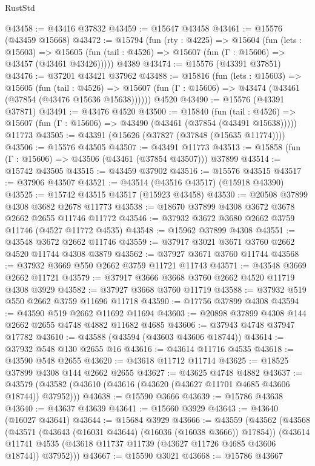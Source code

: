 \begin{lexlean}{RustStd}
\begin{coremodule}
@43458 := @43416 @37832
@43459 := @15647 @43458
@43461 := @15576 (@43459 @15668)
@43472 := @15794
    (fun (rty : @4225) =>
    @15604
      (fun (lets : @15603) =>
      @15605 (fun (tail : @4526) => @15607 (fun (Γ : @15606) => @43457 (@43461 @43426)))))
    @4389
@43474 := @15576 (@43391 @37851)
@43476 := @37201 @43421 @37962
@43488 := @15816
    (fun (lets : @15603) =>
    @15605
      (fun (tail : @4526) =>
      @15607 (fun (Γ : @15606) => @43474 (@43461 (@37854 (@43476 @15636 @15638))))))
    @4520
@43490 := @15576 (@43391 @37871)
@43491 := @43476 @4520
@43500 := @15840
    (fun (tail : @4526) => @15607 (fun (Γ : @15606) => @43490 (@43461 (@37854 (@43491 @15638)))))
    @11773
@43505 := @43391 (@15626 (@37827 (@37848 (@15635 @11774))))
@43506 := @15576 @43505
@43507 := @43491 @11773
@43513 := @15858 (fun (Γ : @15606) => @43506 (@43461 (@37854 @43507))) @37899
@43514 := @15742 @43505
@43515 := @43459 @37902
@43516 := @15576 @43515
@43517 := @37906 @43507
@43521 := @43514 (@43516 @43517) (@15918 @43390)
@43525 := @15742 @43515 @43517 (@15923 @43458)
@43530 := @20508 @37899 @4308 @3682 @2678 @11773
@43538 := @18670 @37899 @4308 @3672 @3678 @2662 @2655 @11746 @11772
@43546 := @37932 @3672 @3680 @2662 @3759 @11746 (@4527 @11772 @4535)
@43548 := @15962 @37899 @4308
@43551 := @43548 @3672 @2662 @11746
@43559 := @37917 @3021 @3671 @3760 @2662 @4520 @11744 @4308 @3879
@43562 := @37927 @3671 @3760 @11744
@43568 := @37932 @3669 @550 @2662 @3759 @11721 @11743
@43571 := @43548 @3669 @2662 @11721
@43579 := @37917 @3666 @3668 @3760 @2662 @4520 @11719 @4308 @3929
@43582 := @37927 @3668 @3760 @11719
@43588 := @37932 @519 @550 @2662 @3759 @11696 @11718
@43590 := @17756 @37899 @4308
@43594 := @43590 @519 @2662 @11692 @11694
@43603 := @20898 @37899 @4308 @144 @2662 @2655 @4748 @4882 @11682 @4685
@43606 := @37943 @4748 @37947 @17782
@43610 := @43588 (@43594 (@43603 @43606 @18744))
@43614 := @37932 @548 @130 @2655 @16
@43616 := @43614 @11716 @4535
@43618 := @43590 @548 @2655
@43620 := @43618 @11712 @11714
@43625 := @18525 @37899 @4308 @144 @2662 @2655
@43627 := @43625 @4748 @4882
@43637 := @43579 (@43582 (@43610 (@43616 (@43620 (@43627 @11701 @4685 @43606 @18744)) @37952)))
@43638 := @15590 @3666
@43639 := @15786 @43638
@43640 := @43637 @43639
@43641 := @15660 @3929
@43643 := @43640 (@16027 @43641)
@43644 := @15684 @3929
@43666 := @43559
    (@43562
      (@43568
        (@43571 (@43643 (@16031 @43644) (@16036 (@16038 @3666)) @17854))
        (@43614 @11741 @4535 (@43618 @11737 @11739 (@43627 @11726 @4685 @43606 @18744)) @37952)))
@43667 := @15590 @3021
@43668 := @15786 @43667

\end{coremodule}
\end{lexlean}

